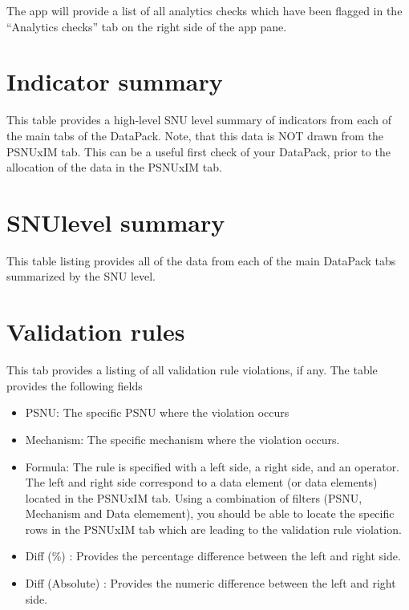 \documentclass[
  openany]{book}
\begin{document}
The app will provide a list of all analytics checks which have been
flagged in the ``Analytics checks'' tab on the right side of the app pane.

\hypertarget{indicator-summary}{%
\section{Indicator summary}\label{indicator-summary}}

This table provides a high-level SNU level summary of indicators from
each of the main tabs of the DataPack. Note, that this data is NOT drawn
from the PSNUxIM tab. This can be a useful first check of your DataPack,
prior to the allocation of the data in the PSNUxIM tab.

\hypertarget{snulevel-summary}{%
\section{SNUlevel summary}\label{snulevel-summary}}

This table listing provides all of the data from each of the main
DataPack tabs summarized by the SNU level.

\hypertarget{validation-rules}{%
\section{Validation rules}\label{validation-rules}}

This tab provides a listing of all validation rule violations, if any.
The table provides the following fields

\begin{itemize}
\item
  PSNU: The specific PSNU where the violation occurs
\item
  Mechanism: The specific mechanism where the violation occurs.
\item
  Formula: The rule is specified with a left side, a right side, and
  an operator. The left and right side correspond to a data element
  (or data elements) located in the PSNUxIM tab. Using a combination
  of filters (PSNU, Mechanism and Data elemement), you should be able
  to locate the specific rows in the PSNUxIM tab which are leading to
  the validation rule violation.
\item
  Diff (\%) : Provides the percentage difference between the left and
  right side.
\item
  Diff (Absolute) : Provides the numeric difference between the left
  and right side.
\end{itemize}
\end{document}
